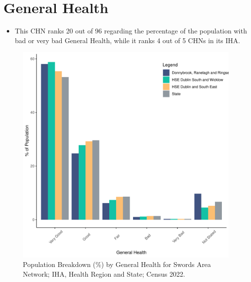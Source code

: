 \documentclass{article}
\begin{document}
\pagebreak

\section{General Health}\label{sect:GenHealth}
\begin{itemize}
\item  This CHN ranks  20 out of 96 regarding the percentage of the population with bad or very bad General Health, while it ranks   4 out of 5 CHNs in its IHA.
\end{itemize}
\begin{figure}[h]
	\centering
	\includegraphics[width = 150mm]{../figures/GenED.pdf}
	\caption{Population Breakdown (\%) by General Health for Swords Area Network; IHA, Health Region and State;  Census 2022.}
	\label{fig:2ae19629-1a6a-13a3-e055-000000000001}
	\end{figure}
\end{document}
